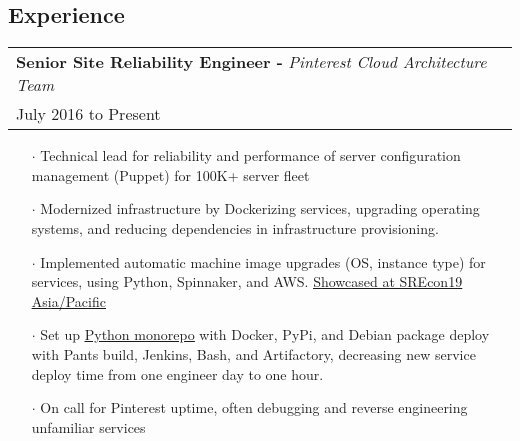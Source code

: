 \documentclass[letterpaper, oneside, final]{scrartcl} %
\begin{document}
\begin{center}

\section{Experience}

\renewcommand{\arraystretch}{1.3}
\begingroup\setlength{\fboxsep}{0pt}
\colorbox{mygray}{
\begin{flushleft}
\begin{tabularx}{\textwidth}{l}
\textbf{Senior Site Reliability Engineer -} \textit{Pinterest Cloud Architecture Team}\\
July 2016 to Present\\
\end{tabularx}
\end{flushleft}
}\endgroup
\vspace{-0.1cm}
\begin{itemize} \itemsep-0.2cm


\item[$\cdot$] Technical lead for reliability and performance of server configuration management (Puppet) for 100K+ server fleet\\
\item[$\cdot$] Modernized infrastructure by Dockerizing services, upgrading operating systems, and reducing dependencies in infrastructure provisioning.\\
\item[$\cdot$] Implemented automatic machine image upgrades (OS, instance type) for services, using Python, Spinnaker, and AWS. \underline{\href{https://www.usenix.org/conference/srecon19asia/presentation/menezes}{Showcased at SREcon19 Asia/Pacific}}\\
\item[$\cdot$] Set up \underline{\href{https://medium.com/pinterest-engineering/building-a-python-monorepo-for-fast-reliable-development-be763781f67}{Python monorepo}} with Docker, PyPi, and Debian package deploy with Pants build, Jenkins, Bash, and Artifactory, decreasing new service deploy time from one engineer day to one hour.\\
\item[$\cdot$] On call for Pinterest uptime, often debugging and reverse engineering unfamiliar services
\end{itemize}


\end{center}
\end{document}
